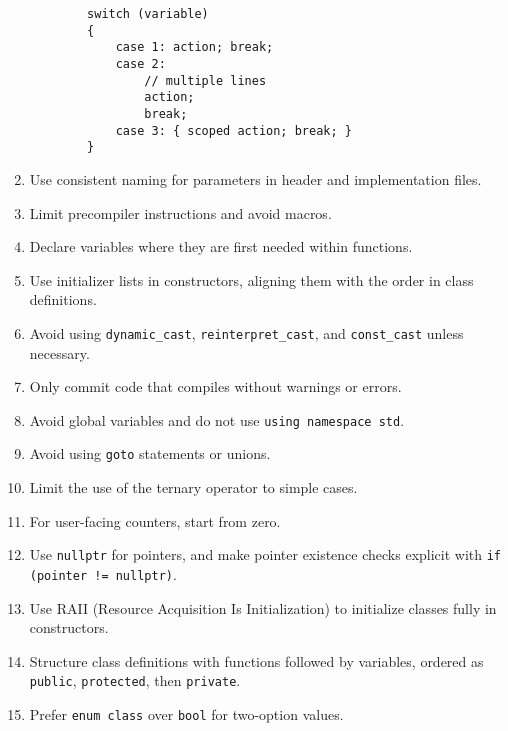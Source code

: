 \documentclass{article}
\begin{document}
\begin{enumerate}[left=0pt, align=left]
\begin{verbatim}
        switch (variable)
        {
            case 1: action; break;
            case 2:
                // multiple lines
                action;
                break;
            case 3: { scoped action; break; }
        }
    \end{verbatim}

    \item Use consistent naming for parameters in header and implementation files.

    \item Limit precompiler instructions and avoid macros.

    \item Declare variables where they are first needed within functions.

    \item Use initializer lists in constructors, aligning them with the order in class definitions.

    \item Avoid using \texttt{dynamic\_cast}, \texttt{reinterpret\_cast}, and \texttt{const\_cast} unless necessary.

    \item Only commit code that compiles without warnings or errors.

    \item Avoid global variables and do not use \texttt{using namespace std}.

    \item Avoid using \texttt{goto} statements or unions.

    \item Limit the use of the ternary operator to simple cases.

    \item For user-facing counters, start from zero.

    \item Use \texttt{nullptr} for pointers, and make pointer existence checks explicit with \texttt{if (pointer != nullptr)}.

    \item Use RAII (Resource Acquisition Is Initialization) to initialize classes fully in constructors.

    \item Structure class definitions with functions followed by variables, ordered as \texttt{public}, \texttt{protected}, then \texttt{private}.

    \item Prefer \texttt{enum class} over \texttt{bool} for two-option values.


\end{enumerate}
\end{document}
